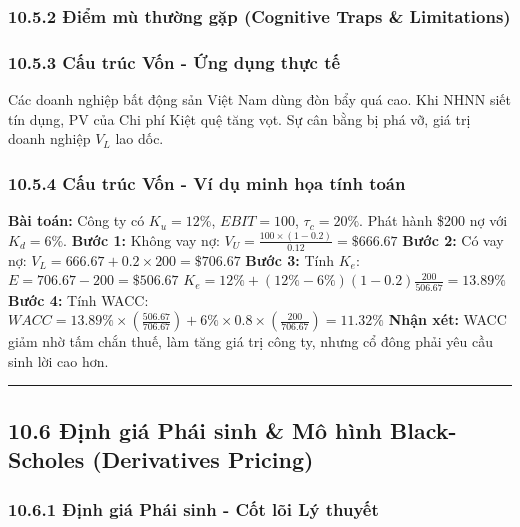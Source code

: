 \documentclass[
]{article}
\begin{document}
\subsubsection{10.5.2 Điểm mù thường gặp (Cognitive Traps \&
Limitations)}\label{ux111iux1ec3m-muxf9-thux1b0ux1eddng-gux1eb7p-cognitive-traps-limitations-85}

\subsubsection{10.5.3 Cấu trúc Vốn - Ứng dụng thực
tế}\label{cux1ea5u-truxfac-vux1ed1n---ux1ee9ng-dux1ee5ng-thux1ef1c-tux1ebf}

Các doanh nghiệp bất động sản Việt Nam dùng đòn bẩy quá cao. Khi NHNN
siết tín dụng, PV của Chi phí Kiệt quệ tăng vọt. Sự cân bằng bị phá vỡ,
giá trị doanh nghiệp \(V_L\) lao dốc.

\subsubsection{10.5.4 Cấu trúc Vốn - Ví dụ minh họa tính
toán}\label{cux1ea5u-truxfac-vux1ed1n---vuxed-dux1ee5-minh-hux1ecda-tuxednh-touxe1n}

\textbf{Bài toán:} Công ty có \(K_u = 12\%\), \(EBIT = 100\),
\(\tau_c = 20\%\). Phát hành \$200 nợ với \(K_d = 6\%\). \textbf{Bước
1:} Không vay nợ: \(V_U = \frac{100 \times (1 - 0.2)}{0.12} = \$666.67\)
\textbf{Bước 2:} Có vay nợ: \(V_L = 666.67 + 0.2 \times 200 = \$706.67\)
\textbf{Bước 3:} Tính \(K_e\): \(E = 706.67 - 200 = \$506.67\)
\(K_e = 12\% + (12\% - 6\%)(1 - 0.2)\frac{200}{506.67} = 13.89\%\)
\textbf{Bước 4:} Tính WACC:
\(WACC = 13.89\% \times \left(\frac{506.67}{706.67}\right) + 6\% \times 0.8 \times \left(\frac{200}{706.67}\right) = 11.32\%\)
\textbf{Nhận xét:} WACC giảm nhờ tấm chắn thuế, làm tăng giá trị công
ty, nhưng cổ đông phải yêu cầu sinh lời cao hơn.

\begin{center}\rule{0.5\linewidth}{0.5pt}\end{center}

\subsection{10.6 Định giá Phái sinh \& Mô hình Black-Scholes
(Derivatives
Pricing)}\label{ux111ux1ecbnh-giuxe1-phuxe1i-sinh-muxf4-huxecnh-black-scholes-derivatives-pricing}

\subsubsection{10.6.1 Định giá Phái sinh - Cốt lõi Lý
thuyết}\label{ux111ux1ecbnh-giuxe1-phuxe1i-sinh---cux1ed1t-luxf5i-luxfd-thuyux1ebft}
\end{document}
